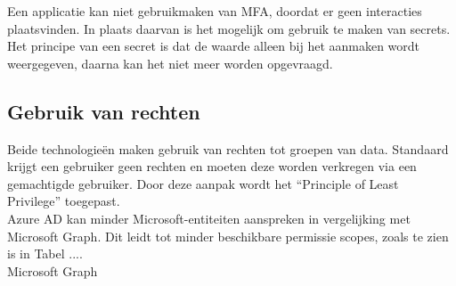 Een applicatie kan niet gebruikmaken van \ac{MFA}, doordat er geen interacties plaatsvinden. In plaats daarvan is het mogelijk om gebruik te maken van secrets. Het principe van een secret is dat de waarde alleen bij het aanmaken wordt weergegeven, daarna kan het niet meer worden opgevraagd.

\subsection{Gebruik van rechten}



Beide technologieën maken gebruik van rechten tot groepen van data. Standaard krijgt een gebruiker geen rechten en moeten deze worden verkregen via een gemachtigde gebruiker. Door deze aanpak wordt het “Principle of Least Privilege” toegepast. \\

Azure \ac{AD} kan minder Microsoft-entiteiten aanspreken in vergelijking met Microsoft Graph. Dit leidt tot minder beschikbare permissie scopes, zoals te zien is in Tabel .... \\

Microsoft Graph %